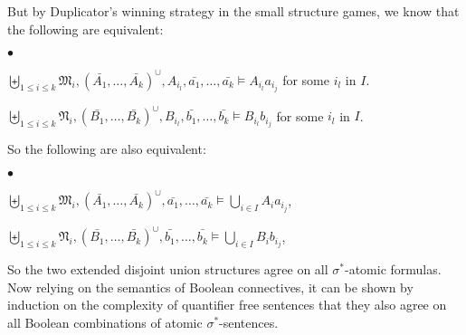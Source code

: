 \documentclass{LMCS}
\newcommand{\frM}{\mathfrak{M}}
\newcommand{\frN}{\mathfrak{N}}
\begin{document}
But by Duplicator's winning strategy in the small structure games, we
know that the following are equivalent:
\begin{iteMize}{$\bullet$}
\item   $\biguplus_{1\leq i\leq k} \frM_i,(\bar{A_1},
\ldots, \bar{A_k})^\cup, A_{i_l}, \bar{a_1},\ldots,\bar{a_k} \models
A_{i_l}a_{i_j}$ for some $i_l$ in $I$.
\item   $\biguplus_{1\leq i\leq k} \frN_i,(\bar{B_1},
\ldots, \bar{B_k})^\cup, B_{i_l}, \bar{b_1},\ldots,\bar{b_k} \models
B_{i_l}b_{i_j}$ for some $i_l$ in $I$.
\end{iteMize}
So the following are also equivalent:
\begin{iteMize}{$\bullet$}
\item $\biguplus_{1\leq i\leq k}
\frM_i,(\bar{A_1}, \ldots, \bar{A_k})^\cup,
\bar{a_1},\ldots,\bar{a_k} \models \bigcup_{i \in I} A_ia_{i_j}$,
\item $\biguplus_{1\leq i\leq k}
\frN_i,(\bar{B_1}, \ldots, \bar{B_k})^\cup,
\bar{b_1},\ldots,\bar{b_k} \models \bigcup_{i \in I} B_ib_{i_j}$,
\end{iteMize}
So the two extended disjoint union structures agree on all
$\sigma^*$-atomic formulas. Now relying on the semantics of
Boolean connectives, it can be shown by induction on the
complexity of quantifier free sentences that they also agree
on all Boolean combinations of atomic $\sigma^*$-sentences.
\end{document}
